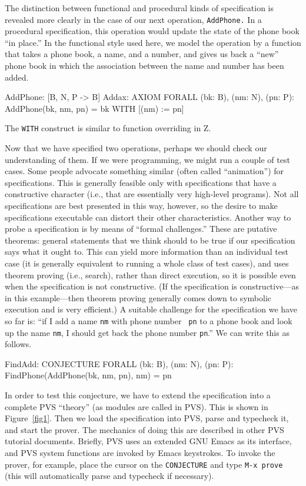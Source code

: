 The distinction between functional and procedural kinds of
specification is revealed more clearly in the case of our next
operation, {\tt AddPhone.}  In a procedural specification, this operation
would update the state of the phone book ``in place.''  In the
functional style used here, we model the operation by a function that
takes a phone book, a name, and a number, and gives us back a ``new''
phone book in which the association between the name and number has
been added.   
\begin{jmrsession}
  AddPhone: [B, N, P -> B]
  Addax: AXIOM   FORALL (bk: B), (nm: N), (pn: P): 
     AddPhone(bk, nm, pn) = bk WITH [(nm) := pn]
\end{jmrsession}
The {\tt WITH} construct is similar to function overriding in Z.

Now that we have specified two operations, perhaps we should check our
understanding of them.  If we were programming, we might run a couple
of test cases.  Some people advocate something similar (often called
``animation'') for specifications.  This is generally feasible only
with specifications that have a constructive character (i.e., that are
essentially very high-level programs).  Not all specifications are
best presented in this way, however, so the desire to make
specifications executable can distort their other characteristics.
Another way to probe a specification is by means of ``formal
challenges.''  These are putative theorems: general statements that we
think should to be true if our specification says what it ought to.
This can yield more information than an individual test case (it is
generally equivalent to running a whole class of test cases), and uses
theorem proving (i.e., search), rather than direct execution, so it is
possible even when the specification is not constructive.  (If the
specification is constructive---as in this example---then theorem
proving generally comes down to symbolic execution and is
very efficient.)  A suitable challenge for the specification
we have so far is: ``if I add a name {\tt nm} with phone number {\tt
pn} to a phone book and look up the name {\tt nm}, I should get back
the phone number {\tt pn}.''  We can write this as follows.
\begin{jmrsession}
  FindAdd: CONJECTURE  FORALL (bk: B), (nm: N), (pn: P):
    FindPhone(AddPhone(bk, nm, pn), nm) = pn
\end{jmrsession}

In order to test this conjecture, we have to extend the specification into a
complete PVS ``theory'' (as modules are called in PVS).  This is shown
in Figure~\ref{fig1}.  Then we load the specification into PVS, parse
and typecheck it, and start the prover.  The mechanics of doing this
are described in other PVS tutorial documents.  Briefly, PVS uses an
extended GNU Emacs as its interface, and PVS system functions are
invoked by Emacs keystrokes.  To invoke the prover, for example, place
the cursor on the {\tt CONJECTURE} and type {\tt M-x prove} (this will
automatically parse and typecheck if necessary).


